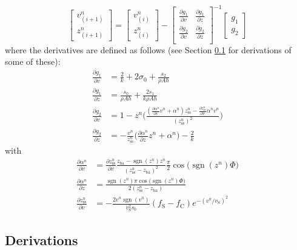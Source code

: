 \documentclass{article}
\DeclareMathOperator{\sgn}{sgn}
\begin{document}
\begin{equation}
    \begin{bmatrix}
    v_{(i+1)}^n\\
    z_{(i+1)}^n
    \end{bmatrix}
    =
    \begin{bmatrix}
    v_{(i)}^n\\
    z_{(i)}^n
    \end{bmatrix}
    -
    \begin{bmatrix}
    \frac{\partial g_1}{\partial v} & \frac{\partial g_1}{\partial z}\\
    \frac{\partial g_2}{\partial v} & \frac{\partial g_2}{\partial z}\\
    \end{bmatrix}^{-1}
    \begin{bmatrix}
    g_1\\
    g_2
    \end{bmatrix}
\end{equation}
where the derivatives are defined as follows (see Section \ref{sec:derivations} for derivations of some of these): 
\begin{align}
    \frac{\partial g_1}{\partial v} &= \frac{2}{k} + 2\sigma_0 + \frac{s_2}{\rho Ah}\\
    \frac{\partial g_1}{\partial z} &= \frac{s_0}{\rho A h} + \frac{2s_1}{k\rho Ah}\\
    \frac{\partial g_2}{\partial v} &=  1-z^n\Bigg(\frac{(\frac{\partial \alpha^n}{\partial v}v^n + \alpha^n)z_\text{ss}^n - \frac{\partial z_\text{ss}^n}{\partial v}\alpha^n v^n}{(z_\text{ss}^n)^2}\Bigg)
    \\\frac{\partial g_2}{\partial z}&= -\frac{v^n}{z_\text{ss}^n}\bigg(\frac{\partial \alpha^n}{\partial z}z^n + \alpha^n\bigg)-\frac{2}{k}
\end{align}
with
\begin{align}
    \frac{\partial\alpha^n}{\partial v} &=\frac{\partial z_\text{ss}^n}{\partial v}\frac{z_\text{ba} - \sgn(z^n) z^n}{(z_\text{ss}^n - z_\text{ba})^2}\frac{\pi}{2}\cos\big(\sgn(z^n)\Phi\big)\\
    \frac{\partial\alpha^n}{\partial z}&=\frac{\sgn(z^n)\pi\cos\big(\sgn(z^n)\Phi\big)}{2(z_\text{ss}^n-z_\text{ba})}\\
    \frac{\partial z_\text{ss}^n}{\partial v} &= -\frac{2 v^n \sgn(v^n)}{v_\text{S}^2 s_0}(f_\text{S}-f_\text{C})e^{-(v^n/v_\text{S})^2}
\end{align}
\subsection{Derivations}\label{sec:derivations}
\end{document}
